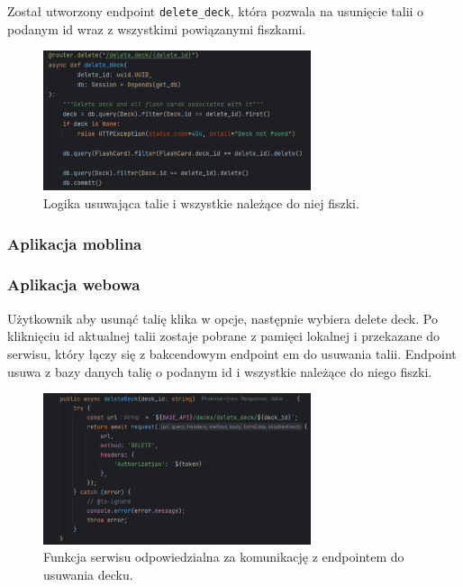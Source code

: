 Został utworzony endpoint \texttt{delete_deck}, która pozwala na usunięcie talii o podanym id wraz z wszystkimi powiązanymi fiszkami.

\begin{figure}[H]
    \centering
    \includegraphics[width=0.7\textwidth]{chapters/chapter_8/screens/delete_deck_backend}
    \caption{Logika usuwająca talie i wszystkie należące do niej fiszki.}
    \label{img:delete_deck_backend}
\end{figure}

\subsubsection{Aplikacja moblina}

\subsubsection{Aplikacja webowa}

Użytkownik aby usunąć talię klika w opcje, następnie wybiera delete deck. Po kliknięciu id aktualnej talii zostaje pobrane z pamięci lokalnej i przekazane do serwisu, który łączy się z bakcendowym endpoint em do usuwania talii. Endpoint usuwa z bazy danych talię o podanym id i wszystkie należące do niego fiszki.

\begin{figure}[H]
    \centering
    \includegraphics[width=0.7\textwidth]{chapters/chapter_8/screens/delete_deck_web}
    \caption{Funkcja serwisu odpowiedzialna za komunikację z endpointem do usuwania decku.}
    \label{img:delete_deck_web}
\end{figure}

